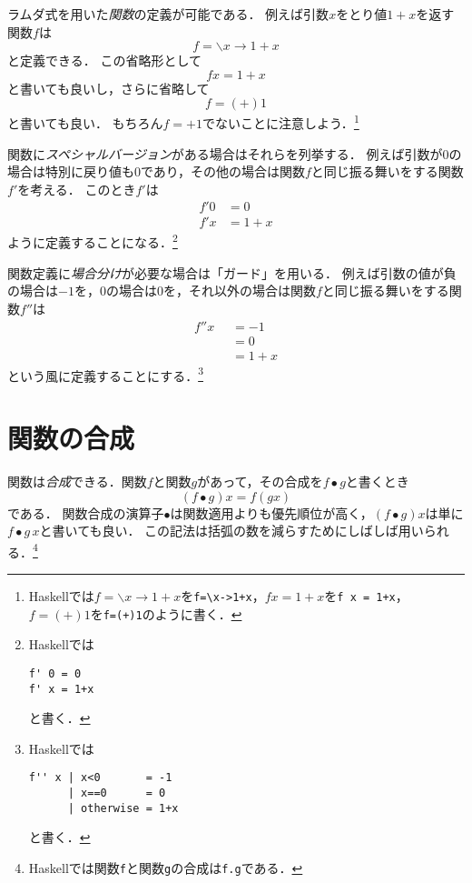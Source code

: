 \documentclass[twocolumn]{jsbook}
\newcommand{\keyword}[1]{\emph{#1}}
\newcommand{\code}[1]{\texttt{#1}}
\newcommand{\lambdasym}{\backslash}
\newcommand{\lambdadot}{\rightarrow}
\newcommand{\lambdaexp}[2]{\lambdasym#1\lambdadot#2}
\newcommand{\binaryeq}{\equiv}
\newcommand{\binaryl}{<}
\newcommand{\binarycompose}{\bullet}
\newcommand{\guard}[1]{\mathop{\mid_{#1}}}
\newcommand{\keywordname}[1]{\mathbf{#1}}
\newcommand{\keywordotherwise}{\keywordname{otherwise}}
\begin{document}
ラムダ式を用いた\keyword{関数}の定義が可能である．
例えば引数$x$をとり値$1+x$を返す関数$f$は$$f=\lambdaexp{x}{1+x}$$と定義できる．
この省略形として$$fx=1+x$$と書いても良いし，さらに省略して$$f=(+)1$$と書いても良い．
もちろん$f=+1$でないことに注意しよう．\footnote{Haskellでは$f=\lambdaexp{x}{1+x}$を\code{f=\textbackslash x->1+x}，$fx=1+x$を\code{f x = 1+x}，$f=(+)1$を\code{f=(+)1}のように書く．}

関数に\keyword{スペシャルバージョン}がある場合はそれらを列挙する．
例えば引数が$0$の場合は特別に戻り値も$0$であり，その他の場合は関数$f$と同じ振る舞いをする関数$f'$を考える．
このとき$f'$は
\begin{equation*}
\begin{split}
f'0&=0\\
f'x&=1+x
\end{split}
\end{equation*}
ように定義することになる．\footnote{Haskellでは
\begin{verbatim}
f' 0 = 0
f' x = 1+x
\end{verbatim}
と書く．}

関数定義に\keyword{場合分け}が必要な場合は「ガード」を用いる．
例えば引数の値が負の場合は$-1$を，$0$の場合は$0$を，それ以外の場合は関数$f$と同じ振る舞いをする関数$f''$は
\begin{equation*}
\begin{split}
f''x&\guard{x\binaryl0}=-1\\
&\guard{x\binaryeq0}=0\\
&\guard{\keywordotherwise}=1+x
\end{split}
\end{equation*}
という風に定義することにする．\footnote{Haskellでは
\begin{verbatim}
f'' x | x<0       = -1
      | x==0      = 0
      | otherwise = 1+x
\end{verbatim}
と書く．}

\section{関数の合成}

関数は\keyword{合成}できる．関数$f$と関数$g$があって，その合成を$f\binarycompose g$と書くとき$$(f\binarycompose g)x=f(gx)$$である．
関数合成の演算子$\binarycompose$は関数適用よりも優先順位が高く，$(f\binarycompose g)x$は単に$f\binarycompose g\,x$と書いても良い．
この記法は括弧の数を減らすためにしばしば用いられる．\footnote{Haskellでは関数\code{f}と関数\code{g}の合成は\code{f.g}である．}
\end{document}
